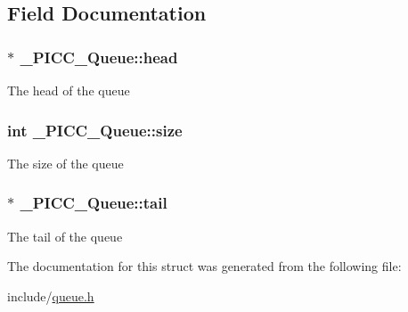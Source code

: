 \subsection{Field Documentation}
\hypertarget{struct__PICC__Queue_a6c2dd9f76d29fead606644750d8c6199}{
\subsubsection[{head}]{$\ast$ \-\_\-\-P\-I\-C\-C\-\_\-\-Queue\-::head}}\label{struct__PICC__Queue_a6c2dd9f76d29fead606644750d8c6199}
The head of the queue \hypertarget{struct__PICC__Queue_aceb7033dbeed397b770d1e0fcb641ffb}{
\subsubsection[{size}]{\setlength{\rightskip}{0pt plus 5cm}int \-\_\-\-P\-I\-C\-C\-\_\-\-Queue\-::size}}\label{struct__PICC__Queue_aceb7033dbeed397b770d1e0fcb641ffb}
The size of the queue \hypertarget{struct__PICC__Queue_a044a1d467b0682868f9ad43dfd93f146}{
\subsubsection[{tail}]{$\ast$ \-\_\-\-P\-I\-C\-C\-\_\-\-Queue\-::tail}}\label{struct__PICC__Queue_a044a1d467b0682868f9ad43dfd93f146}
The tail of the queue 

The documentation for this struct was generated from the following file\-:\begin{DoxyCompactItemize}
\item 
include/\hyperlink{queue_8h}{queue.\-h}\end{DoxyCompactItemize}
